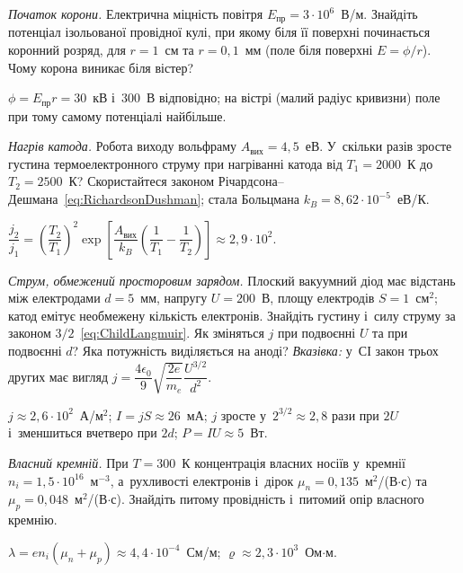 \begin{problem}\label{prb:CoronaOnset}
	\emph{Початок корони.} Електрична міцність повітря $E_{\text{пр}}=3\cdot10^{6}$~В/м.
	Знайдіть потенціал ізольованої провідної кулі, при якому біля її поверхні починається
	коронний розряд, для $r=1$~см та $r=0{,}1$~мм (поле біля поверхні $E=\phi/r$). Чому
	корона виникає біля вістер?
	\begin{solution}
		$\phi=E_{\text{пр}}r=30$~кВ і~$300$~В відповідно; на вістрі (малий радіус кривизни) поле при тому самому потенціалі найбільше.
	\end{solution}
\end{problem}

\begin{problem}\label{prb:RichardsonRatio}
	\emph{Нагрів катода.} Робота виходу вольфраму $A_{\text{вих}}=4{,}5$~еВ. У~скільки
	разів зросте густина термоелектронного струму при нагріванні катода від $T_1=2000$~К
	до $T_2=2500$~К? Скористайтеся законом
	Річардсона--Дешмана~\eqref{eq:RichardsonDushman}; стала Больцмана
	$k_B=8{,}62\cdot10^{-5}$~еВ/К.
	\begin{solution}
		$\dfrac{j_2}{j_1}=\left(\dfrac{T_2}{T_1}\right)^{2}\exp\!\left[\dfrac{A_{\text{вих}}}{k_B}\left(\dfrac1{T_1}-\dfrac1{T_2}\right)\right]\approx2{,}9\cdot10^{2}$.
	\end{solution}
\end{problem}

\begin{problem}\label{prb:ChildLangmuir}
	\emph{Струм, обмежений просторовим зарядом.} Плоский вакуумний діод має відстань між
	електродами $d=5$~мм, напругу $U=200$~В, площу електродів $S=1$~см$^2$; катод емітує
	необмежену кількість електронів. Знайдіть густину і~силу струму за законом
	$3/2$~\eqref{eq:ChildLangmuir}. Як зміняться $j$ при подвоєнні $U$ та при подвоєнні
	$d$? Яка потужність виділяється на аноді? \emph{Вказівка:} у~СІ закон трьох других має
	вигляд $j=\dfrac{4\epsilon_0}{9}\sqrt{\dfrac{2e}{m_e}}\dfrac{U^{3/2}}{d^2}$.
	\begin{solution}
		$j\approx2{,}6\cdot10^{2}$~А/м$^2$; $I=jS\approx26$~мА; $j$ зросте у~$2^{3/2}\approx2{,}8$ рази при $2U$
		і~зменшиться вчетверо при $2d$; $P=IU\approx5$~Вт.
	\end{solution}
\end{problem}

\begin{problem}\label{prb:IntrinsicSilicon}
	\emph{Власний кремній.} При $T=300$~К концентрація власних носіїв у~кремнії
	$n_i=1{,}5\cdot10^{16}$~м$^{-3}$, а~рухливості електронів і~дірок
	$\mu_n=0{,}135$~м$^2$/(В$\cdot$с) та $\mu_p=0{,}048$~м$^2$/(В$\cdot$с). Знайдіть
	питому провідність і~питомий опір власного кремнію.
	\begin{solution}
		$\lambda=en_i(\mu_n+\mu_p)\approx4{,}4\cdot10^{-4}$~См/м; $\varrho\approx2{,}3\cdot10^{3}$~Ом$\cdot$м.
	\end{solution}
\end{problem}

